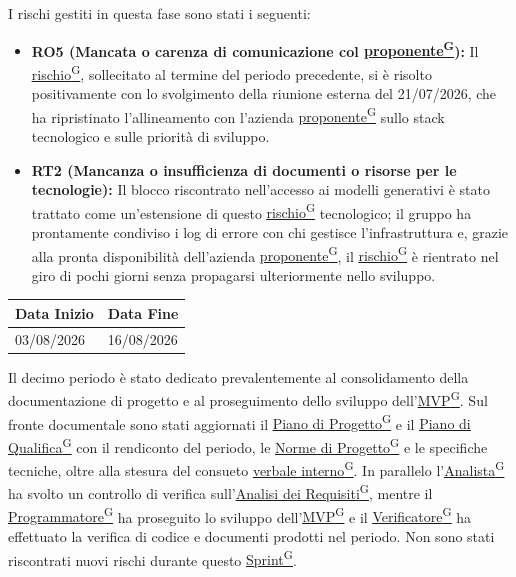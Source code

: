 \documentclass[a4paper,12pt]{article}
\newcounter{subsubsubsection}[subsubsection]
\providecommand{\glslink}[2]{\href{https://alittlebyte-19.github.io/Documentazione/glossario.html\#gls-#1}{\underline{#2}\textsuperscript{\scriptsize G}}}
\begin{document}
I rischi gestiti in questa fase sono stati i seguenti:
\begin{itemize}
    \item \textbf{RO5 (Mancata o carenza di comunicazione col \glslink{committente-proponente}{proponente}):} Il \glslink{rischio}{rischio}, sollecitato al termine del periodo precedente, si è risolto positivamente con lo svolgimento della riunione esterna del 21/07/2026, che ha ripristinato l'allineamento con l'azienda \glslink{committente-proponente}{proponente} sullo stack tecnologico e sulle priorità di sviluppo.
    \item \textbf{RT2 (Mancanza o insufficienza di documenti o risorse per le tecnologie):} Il blocco riscontrato nell'accesso ai modelli generativi è stato trattato come un'estensione di questo \glslink{rischio}{rischio} tecnologico; il gruppo ha prontamente condiviso i log di errore con chi gestisce l'infrastruttura e, grazie alla pronta disponibilità dell'azienda \glslink{committente-proponente}{proponente}, il \glslink{rischio}{rischio} è rientrato nel giro di pochi giorni senza propagarsi ulteriormente nello sviluppo.
\end{itemize}


\label{sec:pb_decimoperiodo}
\begin{table}[H]
    \centering
    \renewcommand{\arraystretch}{1.5}
    \begin{tabularx}{\textwidth}{|X|X|}
    \hline \rowcolor{Dandelion!50}
    \textbf{Data Inizio} & \textbf{Data Fine}\\
    \hline
    03/08/2026 & 16/08/2026\\
    \hline

    \end{tabularx}
\end{table}

Il decimo periodo è stato dedicato prevalentemente al consolidamento della documentazione di progetto e al proseguimento dello sviluppo dell'\glslink{mvp-minimum-viable-product}{MVP}. Sul fronte documentale sono stati aggiornati il \glslink{piano-di-progetto}{Piano di Progetto} e il \glslink{piano-di-qualifica}{Piano di Qualifica} con il rendiconto del periodo, le \glslink{norme-di-progetto}{Norme di Progetto} e le specifiche tecniche, oltre alla stesura del consueto \glslink{verbale-interno}{verbale interno}. In parallelo l'\glslink{analista}{Analista} ha svolto un controllo di verifica sull'\glslink{analisi-dei-requisiti-adr}{Analisi dei Requisiti}, mentre il \glslink{programmatore}{Programmatore} ha proseguito lo sviluppo dell'\glslink{mvp-minimum-viable-product}{MVP} e il \glslink{verificatore}{Verificatore} ha effettuato la verifica di codice e documenti prodotti nel periodo. Non sono stati riscontrati nuovi rischi durante questo \glslink{sprint}{Sprint}.
\end{document}
